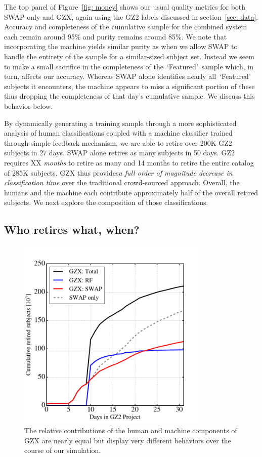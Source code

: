 \documentclass[twocolumn]{aastex6}
\newcommand{\feat}{`Featured'}
\begin{document}
The top panel of Figure~\ref{fig: money} shows our usual quality metrics for both 
SWAP-only and GZX, again using the GZ2 labels discussed in section~\ref{sec: data}.
Accuracy and completeness of the cumulative sample for the combined system 
each remain around 95\% and purity remains around 85\%. We note that 
incorporating the machine yields similar purity as when we 
allow SWAP to handle the entirety of the sample for a similar-sized subject set. 
Instead we seem to make a small sacrifice in the completeness of the~\feat~sample
which, in turn, affects our accuracy. Whereas SWAP alone identifies nearly all~\feat~
subjects it encounters,  the machine appears to miss a significant 
portion of these thus dropping the completeness of that day's 
cumulative sample. We discuss this behavior below.

By dynamically generating a training sample
through a more sophisticated analysis of human classifications coupled with a 
machine classifier trained through simple feedback mechanism, we are able to 
retire over 200K GZ2 subjects in 27 days.  SWAP alone retires as many subjects in 50 days. 
GZ2 requires XX \textit{months} to retire as many and 14 months to retire the entire 
catalog of 285K subjects. 
GZX thus provides\textit{a full order of magnitude decrease in classification time} 
over the traditional crowd-sourced approach. Overall, the humans and the 
machine each contribute approximately half of the overall retired subjects. 
We next explore the composition of those classifications.


\subsection{Who retires what, when?}  

\begin{figure}[t!]
\includegraphics[width=3.65in]{figures/GZ2_sup_PLPD5_p5_flipfeature2b_RF_accuracy_redo_raw_combo_GZX_component_contributions.png}
\caption{The relative contributions of the human and machine components of GZX are nearly equal but display very different behaviors over the course of our simulation.  \label{fig: gzx components}}
\end{figure}
\end{document}
